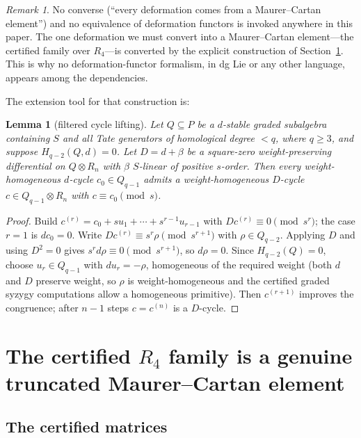 \documentclass[11pt]{article}
\newtheorem{lemma}[theorem]{Lemma}
\theoremstyle{definition}
\theoremstyle{remark}
\newtheorem{remark}[theorem]{Remark}
\begin{document}
\begin{remark}\label{rem:noconverse}
No converse (``every deformation comes from a Maurer--Cartan element'') and
no equivalence of deformation functors is invoked anywhere in this paper.
The one deformation we must convert into a Maurer--Cartan element---the
certified family over $R_4$---is converted by the explicit construction of
Section~\ref{sec:start}.  This is why no deformation-functor formalism, in
dg Lie or any other language, appears among the dependencies.
\end{remark}

The extension tool for that construction is:

\begin{lemma}[filtered cycle lifting]\label{lem:cyclelift}
Let $Q\subseteq P$ be a $d$-stable graded subalgebra containing $S$ and all
Tate generators of homological degree $<q$, where $q\geq3$, and suppose
$H_{q-2}(Q,d)=0$.  Let $D=d+\beta$ be a square-zero weight-preserving
differential on $Q\otimes R_n$ with $\beta$ $S$-linear of positive
$s$-order.  Then every weight-homogeneous $d$-cycle
$c_0\in Q_{q-1}$ admits a weight-homogeneous $D$-cycle
$c\in Q_{q-1}\otimes R_n$ with $c\equiv c_0\pmod s$.
\end{lemma}

\begin{proof}
Build $c^{(r)}=c_0+su_1+\cdots+s^{r-1}u_{r-1}$ with
$Dc^{(r)}\equiv0\pmod{s^r}$; the case $r=1$ is $dc_0=0$.  Write
$Dc^{(r)}\equiv s^r\rho\pmod{s^{r+1}}$ with $\rho\in Q_{q-2}$.  Applying $D$
and using $D^2=0$ gives $s^rd\rho\equiv0\pmod{s^{r+1}}$, so $d\rho=0$.
Since $H_{q-2}(Q)=0$, choose $u_r\in Q_{q-1}$ with $du_r=-\rho$, homogeneous
of the required weight (both $d$ and $D$ preserve weight, so $\rho$ is
weight-homogeneous and the certified graded syzygy computations allow a
homogeneous primitive).  Then $c^{(r+1)}$ improves the congruence; after
$n-1$ steps $c=c^{(n)}$ is a $D$-cycle.
\end{proof}

\section{The certified $R_4$ family is a genuine truncated Maurer--Cartan
element}\label{sec:start}

\subsection{The certified matrices}
\end{document}
